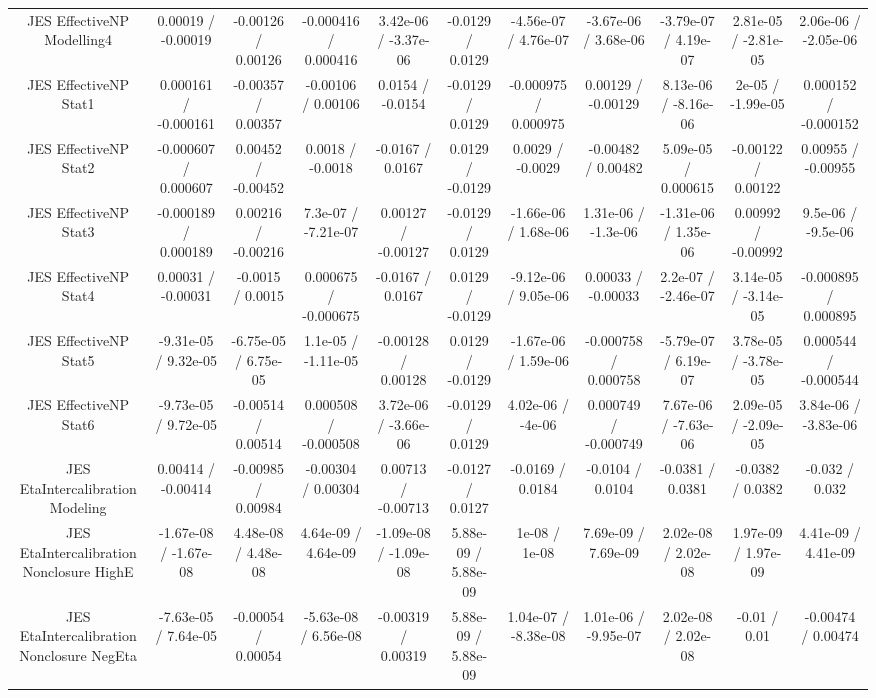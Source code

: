 \begin{table}[htbp]
\begin{center}
\begin{tabular}{|c|c|c|c|c|c|c|c|c|c|c|}
  JES EffectiveNP Modelling4 & 0.00019 / -0.00019 & -0.00126 / 0.00126 & -0.000416 / 0.000416 & 3.42e-06 / -3.37e-06 & -0.0129 / 0.0129 & -4.56e-07 / 4.76e-07 & -3.67e-06 / 3.68e-06 & -3.79e-07 / 4.19e-07 & 2.81e-05 / -2.81e-05 & 2.06e-06 / -2.05e-06 \\ 
  JES EffectiveNP Stat1 & 0.000161 / -0.000161 & -0.00357 / 0.00357 & -0.00106 / 0.00106 & 0.0154 / -0.0154 & -0.0129 / 0.0129 & -0.000975 / 0.000975 & 0.00129 / -0.00129 & 8.13e-06 / -8.16e-06 & 2e-05 / -1.99e-05 & 0.000152 / -0.000152 \\ 
  JES EffectiveNP Stat2 & -0.000607 / 0.000607 & 0.00452 / -0.00452 & 0.0018 / -0.0018 & -0.0167 / 0.0167 & 0.0129 / -0.0129 & 0.0029 / -0.0029 & -0.00482 / 0.00482 & 5.09e-05 / 0.000615 & -0.00122 / 0.00122 & 0.00955 / -0.00955 \\ 
  JES EffectiveNP Stat3 & -0.000189 / 0.000189 & 0.00216 / -0.00216 & 7.3e-07 / -7.21e-07 & 0.00127 / -0.00127 & -0.0129 / 0.0129 & -1.66e-06 / 1.68e-06 & 1.31e-06 / -1.3e-06 & -1.31e-06 / 1.35e-06 & 0.00992 / -0.00992 & 9.5e-06 / -9.5e-06 \\ 
  JES EffectiveNP Stat4 & 0.00031 / -0.00031 & -0.0015 / 0.0015 & 0.000675 / -0.000675 & -0.0167 / 0.0167 & 0.0129 / -0.0129 & -9.12e-06 / 9.05e-06 & 0.00033 / -0.00033 & 2.2e-07 / -2.46e-07 & 3.14e-05 / -3.14e-05 & -0.000895 / 0.000895 \\ 
  JES EffectiveNP Stat5 & -9.31e-05 / 9.32e-05 & -6.75e-05 / 6.75e-05 & 1.1e-05 / -1.11e-05 & -0.00128 / 0.00128 & 0.0129 / -0.0129 & -1.67e-06 / 1.59e-06 & -0.000758 / 0.000758 & -5.79e-07 / 6.19e-07 & 3.78e-05 / -3.78e-05 & 0.000544 / -0.000544 \\ 
  JES EffectiveNP Stat6 & -9.73e-05 / 9.72e-05 & -0.00514 / 0.00514 & 0.000508 / -0.000508 & 3.72e-06 / -3.66e-06 & -0.0129 / 0.0129 & 4.02e-06 / -4e-06 & 0.000749 / -0.000749 & 7.67e-06 / -7.63e-06 & 2.09e-05 / -2.09e-05 & 3.84e-06 / -3.83e-06 \\ 
  JES EtaIntercalibration Modeling & 0.00414 / -0.00414 & -0.00985 / 0.00984 & -0.00304 / 0.00304 & 0.00713 / -0.00713 & -0.0127 / 0.0127 & -0.0169 / 0.0184 & -0.0104 / 0.0104 & -0.0381 / 0.0381 & -0.0382 / 0.0382 & -0.032 / 0.032 \\ 
  JES EtaIntercalibration Nonclosure HighE & -1.67e-08 / -1.67e-08 & 4.48e-08 / 4.48e-08 & 4.64e-09 / 4.64e-09 & -1.09e-08 / -1.09e-08 & 5.88e-09 / 5.88e-09 & 1e-08 / 1e-08 & 7.69e-09 / 7.69e-09 & 2.02e-08 / 2.02e-08 & 1.97e-09 / 1.97e-09 & 4.41e-09 / 4.41e-09 \\ 
  JES EtaIntercalibration Nonclosure NegEta & -7.63e-05 / 7.64e-05 & -0.00054 / 0.00054 & -5.63e-08 / 6.56e-08 & -0.00319 / 0.00319 & 5.88e-09 / 5.88e-09 & 1.04e-07 / -8.38e-08 & 1.01e-06 / -9.95e-07 & 2.02e-08 / 2.02e-08 & -0.01 / 0.01 & -0.00474 / 0.00474 \\ 

\end{tabular}
\end{center}
\end{table}
